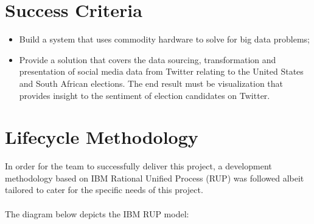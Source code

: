 \documentclass[12pt]{article} %
\begin{document}
	
	
	
	
	
	

	
	
		\section{Success Criteria} %
		
		\begin{itemize}
			\item Build a system that uses commodity hardware to solve for big data problems;
			\item Provide a solution that covers the data sourcing, transformation and presentation of social media data from Twitter relating to the United States and South African elections. The end result must be visualization that provides insight to the sentiment of election candidates on Twitter.
		\end{itemize}
		
	
	\section{Lifecycle Methodology}
	
	
	In order for the team to successfully deliver this project, a development methodology based on IBM Rational Unified Process (RUP) was followed albeit tailored to cater for the specific needs of this project.\\
	\\
	The diagram below depicts the IBM RUP model:
	
\end{document}
